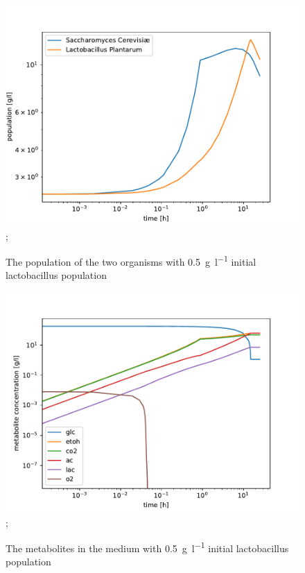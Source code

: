 		\begin{figure}[h]
			\includegraphics[width=\linewidth]{figures/results/cocultures/1_populations.pdf};
			\caption{The population of the two organisms with \SI{0.5}{\gram\per\litre} initial lactobacillus population}
			\label{fig:cocult_1_pop}
		\end{figure}
		
		\begin{figure}[h]
			\includegraphics[width=\linewidth]{figures/results/cocultures/1_metabolites.pdf};
			\caption{The metabolites in the medium with \SI{0.5}{\gram\per\litre} initial lactobacillus population}
			\label{fig:cocult_1_met}
		\end{figure}
		
